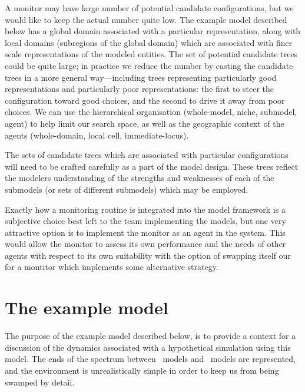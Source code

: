 A monitor may have large number of potential candidate con\-fig\-ur\-a\-tions,
but we would like to keep the actual number quite low. The example
model described below has a global domain associated with a particular
rep\-re\-sen\-ta\-tion, along with local domains (subregions of the global
domain) which are associated with finer scale rep\-re\-sen\-ta\-tions of the
modeled entities. The set of potential candidate trees could be quite
large; in practice we reduce the number by casting the candidate trees
in a more general way---including trees representing particularly
good rep\-re\-sen\-ta\-tions and particularly poor rep\-re\-sen\-ta\-tions: the first
to steer the con\-fig\-ur\-a\-tion toward good choices, and the second to
drive it away from poor choices. We can use the hierarchical
organisation (whole-model, niche, sub\-model, agent) to help limit our
search space, as well as the geographic context of the agents (whole-domain, local
cell, immediate-locus).

The sets of candidate trees which are associated with particular
con\-fig\-ur\-a\-tions will need to be crafted carefully as a part of the
model design. These trees reflect the modelers understanding of the
strengths and weaknesses of each of the sub\-models (or sets of
different sub\-models) which may be employed.

Exactly how a monitoring routine is integrated into the model
framework is a subjective choice best left to the team implementing
the models, but one very attractive option is to implement the monitor
as an agent in the system. This would allow the monitor to assess its
own performance and the needs of other agents with respect to its own
suitability with the option of swapping itself our for a montitor
which implements some alternative strategy. 


\section{The example model}

The purpose of the example model described below, is to provide a
context for a discussion of the dynamics associated with a
hypothetical simulation using this model.  The ends of the
spectrum between \SD\ models and \IB\ models are represented, and the
environment is unrealistically simple in order to keep us from being
swamped by detail. 

